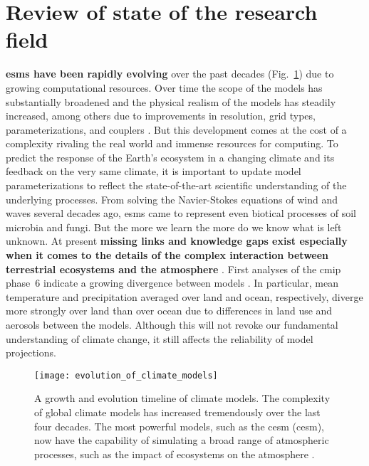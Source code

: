 \section{Review of state of the research field}
\label{sec:review}

\textbf{\glspl{esm} have been rapidly evolving} over the past decades (Fig.~\ref{fig:growth_esm}) due to growing computational resources. Over time the scope of the models has substantially broadened and the physical realism of the models has steadily increased, among others due to improvements in resolution, grid types, parameterizations, and couplers \parencite{AMS:Randall2018}. But this development comes at the cost of a complexity rivaling the real world and immense resources for computing. To predict the response of the Earth’s ecosystem in a changing climate and its feedback on the very same climate, it is important to update model parameterizations to reflect the state-of-the-art scientific understanding of the underlying processes. From solving the Navier-Stokes equations of wind and waves several decades ago, \glspl{esm} came to represent even biotical processes of soil microbia and fungi. But the more we learn the more do we know what is left unknown. At present \textbf{missing links and knowledge gaps exist especially when it comes to the details of the complex interaction between terrestrial ecosystems and the atmosphere} \parencites{Bonan2019}{ACR:Steiner2020}. First analyses of the \gls{cmip} phase~6 indicate a growing divergence between models \parencite{ESD:Tebaldi2021}. In particular, mean temperature and precipitation averaged over land and ocean, respectively, diverge more strongly over land than over ocean due to differences in land use and aerosols between the models. Although this will not revoke our fundamental understanding of climate change, it still affects the reliability of model projections.\\

\begin{figure}[!ht]
  \centering
  \texttt{[image: evolution\_of\_climate\_models]}
  \caption{A growth and evolution timeline of climate models. The complexity of global climate models has increased tremendously over the last four decades. The most powerful models, such as the \acrlong{cesm} (\acrshort{cesm}), now have the capability of simulating a broad range of atmospheric processes, such as the impact of ecosystems on the atmosphere \parencite{growth_of_climate_modeling}.}
  \label{fig:growth_esm}
  \vspace*{-10pt}
\end{figure}


